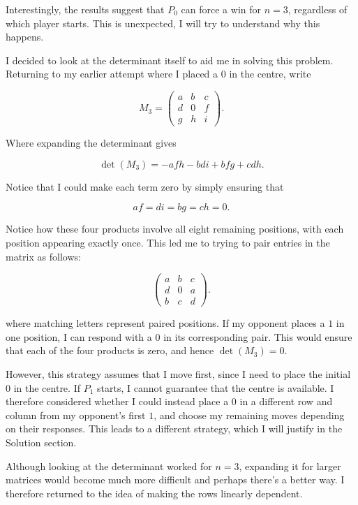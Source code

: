\documentclass[11pt]{article}
\newcommand{\keywordfont}{\textsc}
\newcommand{\keyword}[1]{%
  \marginpar{\raggedright\small\keywordfont{#1}}}
\begin{document}
\keyword{NOTE}
Interestingly, the results suggest
that $P_0$ can force a win for $n=3$,
regardless of which player starts.
This is unexpected, I will try
to understand why this happens.

\medskip
\keyword{ATTEMPT}
I decided to look at the determinant
itself to aid me in solving this problem. Returning to my earlier attempt where I placed a $0$ in the centre, write

$$ M_3=\begin{pmatrix}
a&b&c\\
d&0&f\\
g&h&i
\end{pmatrix}.$$

Where expanding the determinant gives

$$ \det(M_3)=-afh-bdi+bfg+cdh. $$

Notice that I could make each
term zero by simply ensuring that

$$ af=di=bg=ch=0. $$

Notice how these four products involve all eight remaining positions, with each
position appearing exactly once.
This led me to trying to pair entries in the matrix as follows:

$$
\begin{pmatrix}
a&b&c\\
d&0&a\\
b&c&d
\end{pmatrix}.
$$

where matching letters represent
paired positions.
If my opponent places a $1$ in
one position, I can respond with
a $0$ in its corresponding pair. This would
ensure that each of the four
products is zero, and hence
$\det(M_3)=0$.

\medskip
\keyword{CHECK}
However, this strategy assumes
that I move first, since I need
to place the initial $0$ in the
centre.
If $P_1$ starts, I cannot guarantee
that the centre is available.
I therefore considered whether
I could instead place a $0$ in
a different row and column from
my opponent's first $1$, and
choose my remaining moves depending
on their responses.
This leads to a different strategy,
which I will justify in the
Solution section.


\medskip
\keyword{STUCK}

Although looking at the determinant
worked for $n=3$, expanding it for larger matrices would become much more difficult and perhaps there's a better way.
I therefore returned to the idea
of making the rows linearly dependent.
\medskip
\keyword{IDEA}
\end{document}

